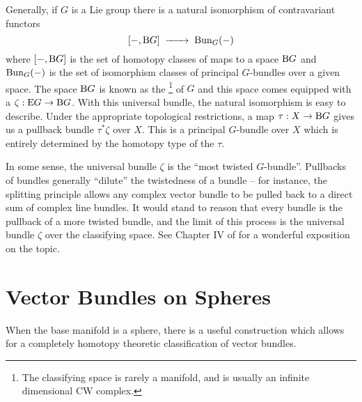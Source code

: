 \begin{theorem}\label{thm:classifying-space}
\end{theorem}
	Generally, if $G$ is a Lie group there is a natural isomorphism of contravariant functors
	\[
		[-, \BB G] \lkxto \Bun_G(-)
	\]
	where $[-, \mathrm{B} G]$ is the set of homotopy classes of maps to a space $\mathrm{B} G$ and $\operatorname{Bun}_G(-)$ is the set of isomorphism classes of principal $G$-bundles over a given space.
	The space $\mathrm{B} G$ is known as the \footnote{The classifying space is rarely a manifold, and is usually an infinite dimensional CW complex.} of $G$ and this space comes equipped with a  $\zeta : \mathrm{E} G \to \mathrm{B} G$. With this universal bundle, the natural isomorphism is easy to describe. Under the appropriate topological restrictions, a map $\tau : X \to \mathrm{B} G$ gives us a pullback bundle $\tau^*\zeta$ over $X$. This is a principal $G$-bundle over $X$ which is entirely determined by the homotopy type of the  $\tau$.

	In some sense, the universal bundle $\zeta$ is the ``most twisted $G$-bundle''. Pullbacks of bundles generally ``dilute'' the twistedness of a bundle -- for instance, the splitting principle allows any complex vector bundle to be pulled back to a direct sum of complex line bundles. It would stand to reason that every bundle is the pullback of a more twisted bundle, and the limit of this process is the universal bundle $\zeta$ over the classifying space. See Chapter IV of \cite{botttu1982differential} for a wonderful exposition on the topic.


\section{Vector Bundles on Spheres}

When the base manifold is a sphere, there is a useful construction which allows for a completely homotopy theoretic classification of vector bundles.

